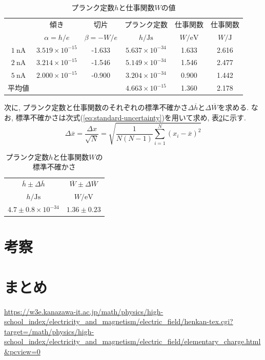 \documentclass{jarticle}
\begin{document}
\begin{table}[H]
  \centering
  \caption{プランク定数$h$と仕事関数$W$の値}
  \label{tb:a-b-h-w}
  \begin{tabular}{cccccc}
    \hline
    & 傾き & 切片 & プランク定数 & 仕事関数 & 仕事関数 \\
    & $\alpha = h / e$ & $\beta = -W / e$ & $h/\mathrm{Js}$ & $W/\mathrm{eV}$ & $W/\mathrm{J}$\\
    \hline
    $1\ \mathrm{nA}$ & $3.519\times10^{-15}$ & -1.633 & $5.637\times10^{-34}$ & 1.633 & 2.616 \\
    $2\ \mathrm{nA}$ & $3.214\times10^{-15}$ & -1.546 & $5.149\times10^{-34}$ & 1.546 & 2.477 \\
    $5\ \mathrm{nA}$ & $2.000\times10^{-15}$ & -0.900 & $3.204\times10^{-34}$ & 0.900 & 1.442 \\
    \hline
    平均値 & & & $4.663\times10^{-15}$ & 1.360 & 2.178 \\
    \hline
  \end{tabular}
\end{table}

次に, プランク定数と仕事関数のそれぞれの標準不確かさ$\Delta\overline{h}$と$\Delta\overline{W}$を求める.
なお, 標準不確かさは次式(\ref{eq:standard-uncertainty})を用いて求め, 表\ref{tb:standard-uncertainty}に示す.
\begin{equation}
  \Delta\overline{x} = \frac{\Delta x}{\sqrt{N}} = \sqrt{\frac{1}{N(N-1)}\sum_{i=1}^N(x_i - \overline{x})^2}
  \label{eq:standard-uncertainty}
\end{equation}

\begin{table}[H]
  \centering
  \caption{プランク定数$h$と仕事関数$W$の標準不確かさ}
  \label{tb:standard-uncertainty}
  \begin{tabular}{cc}
    \hline
    $\overline{h}\pm\Delta\overline{h}$ & $\overline{W}\pm\Delta\overline{W}$ \\
    $h/\mathrm{Js}$ & $W/\mathrm{eV}$ \\
    \hline
    $4.7\pm0.8\times10^{-34}$ & $1.36\pm0.23$ \\
    \hline
  \end{tabular}
\end{table}



\section{考察}



\section{まとめ}



\begin{thebibliography}{99}

   \url{https://w3e.kanazawa-it.ac.jp/math/physics/high-school_index/electricity_and_magnetism/electric_field/henkan-tex.cgi?target=/math/physics/high-school_index/electricity_and_magnetism/electric_field/elementary_charge.html&pcview=0}

\end{thebibliography}
\end{document}

